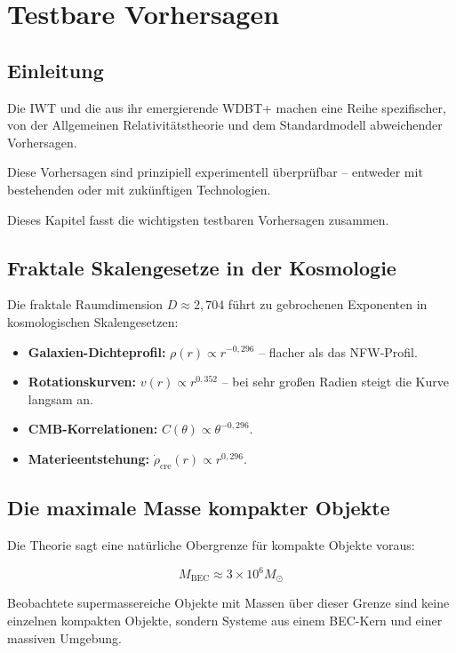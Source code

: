 \chapter{Testbare Vorhersagen}

\section{Einleitung}

Die IWT und die aus ihr emergierende WDBT+ machen eine Reihe spezifischer, von der Allgemeinen Relativitätstheorie und dem Standardmodell abweichender Vorhersagen.

Diese Vorhersagen sind prinzipiell experimentell überprüfbar – entweder mit bestehenden oder mit zukünftigen Technologien.

Dieses Kapitel fasst die wichtigsten testbaren Vorhersagen zusammen.

\section{Fraktale Skalengesetze in der Kosmologie}

Die fraktale Raumdimension \( D \approx 2,704 \) führt zu gebrochenen Exponenten in kosmologischen Skalengesetzen:

\begin{itemize}
\item \textbf{Galaxien-Dichteprofil:} \( \rho(r) \propto r^{-0,296} \) – flacher als das NFW-Profil.
\item \textbf{Rotationskurven:} \( v(r) \propto r^{0,352} \) – bei sehr großen Radien steigt die Kurve langsam an.
\item \textbf{CMB-Korrelationen:} \( C(\theta) \propto \theta^{-0,296} \).
\item \textbf{Materieentstehung:} \( \dot{\rho}_{\text{cre}}(r) \propto r^{0,296} \).
\end{itemize}

\section{Die maximale Masse kompakter Objekte}

Die Theorie sagt eine natürliche Obergrenze für kompakte Objekte voraus:

\[
M_{\text{BEC}} \approx 3 \times 10^6 M_{\odot}
\]

Beobachtete supermassereiche Objekte mit Massen über dieser Grenze sind keine einzelnen kompakten Objekte, sondern Systeme aus einem BEC-Kern und einer massiven Umgebung.

